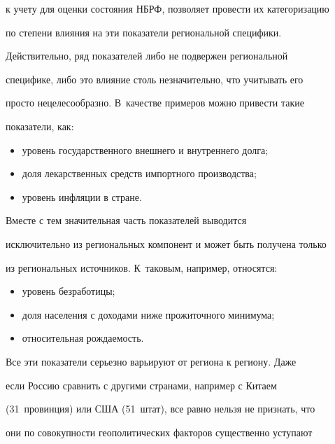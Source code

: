 к учету для оценки состояния НБРФ, позволяет провести их категоризацию


по степени влияния на эти показатели региональной специфики.


Действительно, ряд показателей либо не подвержен региональной


специфике, либо это влияние столь незначительно, что учитывать его


просто нецелесообразно. В~качестве примеров можно привести такие


показатели, как:


    \begin{itemize}


\item уровень государственного внешнего и внутреннего долга;


\item доля лекарственных средств импортного производства;


\item уровень инфляции в стране.


\end{itemize}





    Вместе с тем значительная часть показателей выводится


исключительно из региональных компонент и может быть получена только


из региональных источников. К~таковым, например, относятся:


    \begin{itemize}


\item уровень безработицы;


\item доля населения с доходами ниже прожиточного минимума;


\item относительная рождаемость.


\end{itemize}





    Все эти показатели серьезно варьируют от региона к региону. Даже


если Россию сравнить с другими странами, например с Китаем


(31~провинция) или США (51~штат), все равно нельзя не признать, что


они по совокупности геополитических факторов существенно уступают


